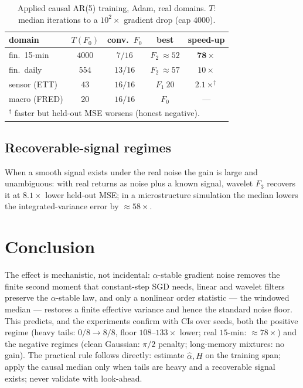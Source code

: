\documentclass[conference]{IEEEtran}
\begin{document}
\begin{table}[t]
\caption{Applied causal AR(5) training, Adam, real domains. $T$: median
iterations to a $10^2\times$ gradient drop (cap $4000$).}
\label{tab:applied}
\centering
\begin{tabular}{lcccc}
\toprule
domain & $T(F_0)$ & conv.\ $F_0$ & best & speed-up\\
\midrule
fin.\ 15-min  & $4000$ & $7/16$  & $F_2\ {\approx}52$ & $\mathbf{78\times}$\\
fin.\ daily   & $554$  & $13/16$ & $F_2\ {\approx}57$ & $10\times$\\
sensor (ETT)  & $43$   & $16/16$ & $F_1\ 20$          & $2.1\times^{\dagger}$\\
macro (FRED)  & $20$   & $16/16$ & $F_0$              & ---\\
\bottomrule
\multicolumn{5}{l}{\footnotesize $^{\dagger}$ faster but held-out MSE
worsens (honest negative).}
\end{tabular}
\end{table}

\subsection{Recoverable-signal regimes}
When a smooth signal exists under the real noise the gain is large and
unambiguous: with real returns as noise plus a known signal, wavelet
$F_3$ recovers it at $8.1\times$ lower held-out MSE; in a
microstructure simulation the median lowers the integrated-variance
error by $\approx58\times$.

\section{Conclusion}

The effect is mechanistic, not incidental: $\alpha$-stable gradient
noise removes the finite second moment that constant-step SGD needs,
linear and wavelet filters preserve the $\alpha$-stable law, and only a
nonlinear order statistic --- the windowed median --- restores a finite
effective variance and hence the standard noise floor. This predicts,
and the experiments confirm with CIs over seeds, both the positive
regime (heavy tails: $0/8\to8/8$, floor $108$--$133\times$ lower;
real $15$-min: $\approx78\times$) and the negative regimes (clean
Gaussian: $\pi/2$ penalty; long-memory mixtures: no gain). The
practical rule follows directly: estimate $\hat\alpha,\hat H$ on the
training span; apply the causal median only when tails are heavy and a
recoverable signal exists; never validate with look-ahead.



\end{document}
